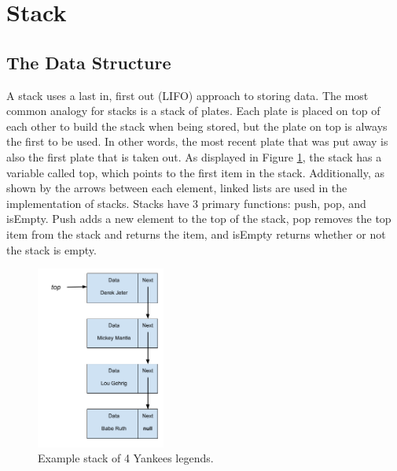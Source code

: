 \documentclass[letterpaper, 10pt,DIV=13]{scrartcl}
\numberwithin{equation}{section} %
\numberwithin{figure}{section} %
\numberwithin{table}{section} %
\begin{document}
\section{Stack}
\subsection{The Data Structure}\label{stackDataStructure}
A stack uses a last in, first out (LIFO) approach to storing data. The most common analogy for stacks is a stack of plates. Each plate is placed on top of each other to build the stack when being stored, but the plate on top is always the first to be used. In other words, the most recent plate that was put away is also the first plate that is taken out. As displayed in Figure \ref{figure:stack}, the stack has a variable called top, which points to the first item in the stack. Additionally, as shown by the arrows between each element, linked lists are used in the implementation of stacks. Stacks have 3 primary functions: push, pop, and isEmpty. Push adds a new element to the top of the stack, pop removes the top item from the stack and returns the item, and isEmpty returns whether or not the stack is empty.

\begin{figure}[ht] 
    \centering 
    \includegraphics[height=6cm]{stack}
    \caption{Example stack of 4 Yankees legends.}
    \label{figure:stack}
 \end{figure}
\end{document}

